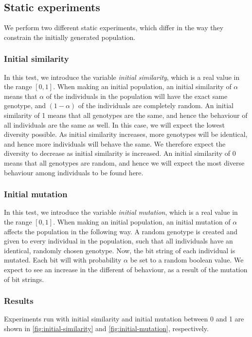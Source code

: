 \subsection{Static experiments}
We perform two different static experiments, which differ in the way they constrain the initially generated population. 

\subsubsection{Initial similarity}
In this test, we introduce the variable \emph{initial similarity}, which is a real value in the range $[0,1]$.
When making an initial population, an initial similarity of $\alpha$ means that $\alpha$ of the individuals in the population will have the exact same genotype, and $(1-\alpha)$ of the individuals are completely random.
An initial similarity of \num{1} means that all genotypes are the same, and hence the behaviour of all individuals are the same as well. In this case, we will expect the lowest diversity possible.
As initial similarity increases, more genotypes will be identical, and hence more individuals will behave the same.
We therefore expect the diversity to decrease as initial similarity is increased.
An initial similarity of \num{0} means that all genotypes are random, and hence we will expect the most diverse behaviour among individuals to be found here.

\subsubsection{Initial mutation}
In this test, we introduce the variable \emph{initial mutation}, which is a real value in the range $[0,1]$.
When making an initial population, an initial mutation of $\alpha$ affects the population in the following way.
A random genotype is created and given to every individual in the population, such that all individuals have an identical, randomly chosen genotype.
Now, the bit string of each individual is mutated. Each bit will with probability $\alpha$ be set to a random boolean value. 
We expect to see an increase in the different of behaviour, as a result of the mutation of bit strings. 

\subsubsection{Results}
Experiments run with initial similarity and initial mutation between 0 and 1 are shown in \cref{fig:initial-similarity} and \cref{fig:initial-mutation}, respectively.


